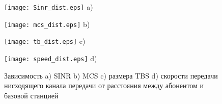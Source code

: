 \begin{figure} [!h]
\begin{minipage}[h]{0.47\linewidth}
\center
\texttt{[image: Sinr\_dist.eps]} a) \\
\end{minipage}
\hfill
\begin{minipage}[h]{0.47\linewidth}
\center
\texttt{[image: mcs\_dist.eps]} b) \\
\end{minipage}
\vfill
\begin{minipage}[h]{0.47\linewidth}
\center
\texttt{[image: tb\_dist.eps]} c) \\
\end{minipage}
\hfill
\begin{minipage}[h]{0.47\linewidth}
\center
\texttt{[image: speed\_dist.eps]} d) \\
\end{minipage}
\caption{Зависимость a) SINR b) MCS c) размера TBS d) скорости передачи нисходящего канала передачи от расстояния между абонентом и базовой станцией}
\label{img:dist}
\end{figure}

